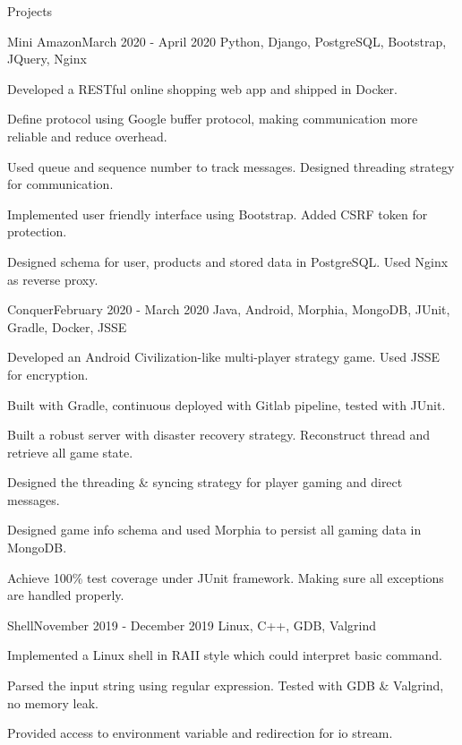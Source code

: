 \documentclass{cv}
\begin{document}
	\begin{rSection}
		{Projects}

		\begin{rSubsection}
			{Mini Amazon}{March 2020 - April 2020}
			{Python, Django, PostgreSQL, Bootstrap, JQuery, Nginx}{} \item Developed a
			RESTful online shopping web app and shipped in Docker. \item Define
			protocol using Google buffer protocol, making communication more reliable and
			reduce overhead. \item Used queue and sequence number to track messages. Designed
			threading strategy for communication. \item Implemented user friendly
			interface using Bootstrap. Added CSRF token for protection. \item Designed
			schema for user, products and stored data in PostgreSQL. Used Nginx as
			reverse proxy.
		\end{rSubsection}
		\begin{rSubsection}
			{Conquer}{February 2020 - March 2020}
			{Java, Android, Morphia, MongoDB, JUnit, Gradle, Docker, JSSE}{} \item Developed
			an Android Civilization-like multi-player strategy game. Used JSSE for
			encryption. \item Built with Gradle, continuous deployed with Gitlab
			pipeline, tested with JUnit. \item Built a robust server with disaster
			recovery strategy. Reconstruct thread and retrieve all game state. \item
			Designed the threading \& syncing strategy for player gaming and direct
			messages. \item Designed game info schema and used Morphia to persist all gaming
			data in MongoDB. \item Achieve 100\% test coverage under JUnit framework.
			Making sure all exceptions are handled properly.
		\end{rSubsection}

		\begin{rSubsection}
			{Shell}{November 2019 - December 2019} {Linux, C++, GDB, Valgrind}{} \item
			Implemented a Linux shell in RAII style which could interpret basic command.
			\item Parsed the input string using regular expression. Tested with GDB \&
			Valgrind, no memory leak. \item Provided access to environment variable and
			redirection for io stream.
		\end{rSubsection}
	\end{rSection}
\end{document}
